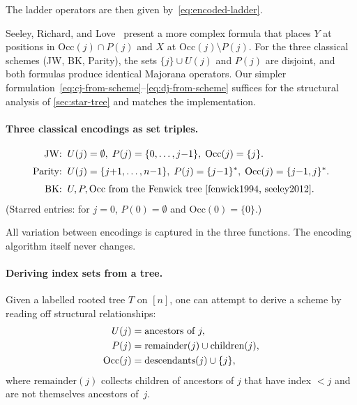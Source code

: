 The ladder operators are then given by~\eqref{eq:encoded-ladder}.

\begin{remark}
\label{rem:srl}
Seeley, Richard, and Love~\cite{seeley2012} present a more complex
formula that places $Y$ at positions in $\mathrm{Occ}(j) \cap P(j)$
and $X$ at $\mathrm{Occ}(j) \setminus P(j)$.  For the three classical
schemes (JW, BK, Parity), the sets $\{j\} \cup U(j)$ and $P(j)$ are
disjoint, and both formulas produce identical Majorana operators.  Our
simpler formulation~\eqref{eq:cj-from-scheme}--\eqref{eq:dj-from-scheme}
suffices for the structural analysis of \cref{sec:star-tree} and
matches the implementation.
\end{remark}

\paragraph{Three classical encodings as set triples.}
\begin{align}
  \text{JW:}\;&\;
    U(j) = \emptyset,\;
    P(j) = \{0,\ldots,j{-}1\},\;
    \mathrm{Occ}(j) = \{j\}.
    \label{eq:jw-scheme} \\[3pt]
  \text{Parity:}\;&\;
    U(j) = \{j{+}1,\ldots,n{-}1\},\;
    P(j) = \{j{-}1\}^*,\;
    \mathrm{Occ}(j) = \{j{-}1,j\}^*.
    \label{eq:parity-scheme} \\[3pt]
  \text{BK:}\;&\;
    U, P, \mathrm{Occ}\text{ from the Fenwick tree}
    ~\cite{fenwick1994, seeley2012}.
    \label{eq:bk-scheme}
\end{align}
(Starred entries: for $j = 0$, $P(0) = \emptyset$ and
$\mathrm{Occ}(0) = \{0\}$.)

All variation between encodings is captured in the three
functions.  The encoding algorithm itself never changes.

\paragraph{Deriving index sets from a tree.}
Given a labelled rooted tree $T$ on $[n]$, one can attempt to derive
a scheme by reading off structural relationships:
\begin{align}
  U(j) &= \text{ancestors of } j, \notag \\
  P(j) &= \text{remainder}(j) \cup \text{children}(j), \notag \\
  \mathrm{Occ}(j) &= \text{descendants}(j) \cup \{j\},
  \label{eq:tree-derived-sets}
\end{align}
where $\text{remainder}(j)$ collects children of ancestors of $j$
that have index $< j$ and are not themselves ancestors of~$j$.

